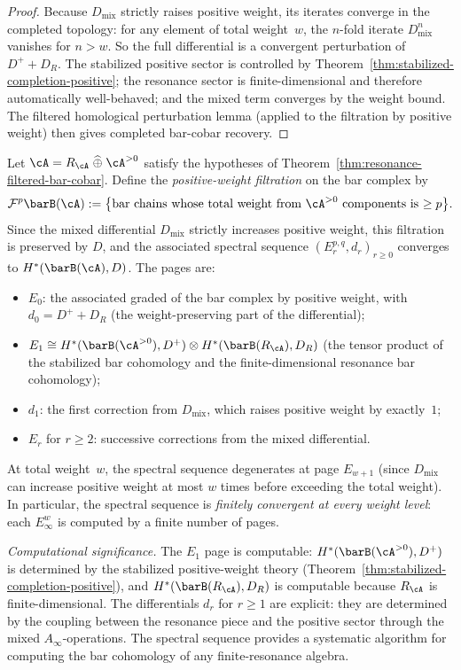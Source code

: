 \begin{proof}
Because $D_{\mathrm{mix}}$ strictly raises positive weight, its
iterates converge in the completed topology: for any element of
total weight~$w$, the $n$-fold iterate $D_{\mathrm{mix}}^n$
vanishes for $n > w$.  So the full differential is a convergent
perturbation of $D^+ + D_R$.  The stabilized positive sector is
controlled by Theorem~\ref{thm:stabilized-completion-positive};
the resonance sector is finite-dimensional and therefore
automatically well-behaved; and the mixed term converges by the
weight bound.  The filtered homological perturbation lemma
(applied to the filtration by positive weight)
then gives completed bar-cobar recovery.
\end{proof}

\begin{construction}
\label{const:resonance-spectral-sequence}
Let $\cA = R_\cA \;\widehat{\oplus}\; \cA^{>0}$ satisfy the
hypotheses of
Theorem~\ref{thm:resonance-filtered-bar-cobar}.  Define the
\emph{positive-weight filtration} on the bar complex by
\[
\mathcal{F}^p \barB(\cA)
:= \bigl\{\text{bar chains whose total weight from $\cA^{>0}$
components is $\ge p$}\bigr\}.
\]
Since the mixed differential $D_{\mathrm{mix}}$ strictly
increases positive weight, this filtration is preserved by $D$,
and the associated spectral sequence
$(E_r^{p,q}, d_r)_{r \ge 0}$ converges to
$H^*(\barB(\cA), D)$.  The pages are:
\begin{itemize}
\item $E_0$: the associated graded of the bar complex by
  positive weight, with $d_0 = D^+ + D_R$ (the weight-preserving
  part of the differential);
\item $E_1 \cong H^*(\barB(\cA^{>0}), D^+) \otimes
  H^*(\barB(R_\cA), D_R)$ (the tensor product of the
  stabilized bar cohomology and the finite-dimensional
  resonance bar cohomology);
\item $d_1$: the first correction from $D_{\mathrm{mix}}$,
  which raises positive weight by exactly~$1$;
\item $E_r$ for $r \ge 2$: successive corrections from the mixed
  differential.
\end{itemize}
At total weight~$w$, the spectral sequence degenerates at page
$E_{w+1}$ (since $D_{\mathrm{mix}}$ can increase positive
weight at most $w$ times before exceeding the total weight).
In particular, the spectral sequence is
\emph{finitely convergent at every weight level}: each $E_\infty^w$
is computed by a finite number of pages.

\emph{Computational significance.}
The $E_1$ page is computable:
$H^*(\barB(\cA^{>0}), D^+)$ is determined by the stabilized
positive-weight theory
(Theorem~\ref{thm:stabilized-completion-positive}), and
$H^*(\barB(R_\cA), D_R)$ is computable because $R_\cA$ is
finite-dimensional.  The differentials $d_r$ for $r \ge 1$ are
explicit: they are determined by the coupling between the
resonance piece and the positive sector through the
mixed $A_\infty$-operations.  The spectral sequence provides a
systematic algorithm for computing the bar cohomology of any
finite-resonance algebra.
\end{construction}

